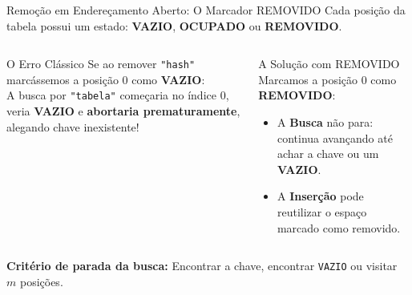 \documentclass[aspectratio=169,11pt]{beamer}
\begin{document}
\begin{frame}{Remoção em Endereçamento Aberto: O Marcador REMOVIDO}
  Cada posição da tabela possui um estado: \textbf{VAZIO}, \textbf{OCUPADO} ou \textbf{REMOVIDO}.

  \begin{columns}[T]
      \begin{alertblock}{O Erro Clássico}
        Se ao remover \texttt{"hash"} marcássemos a posição 0 como \textbf{VAZIO}:\\
        \vspace{0.4em}
        A busca por \texttt{"tabela"} começaria no índice 0, veria \textbf{VAZIO} e \textbf{abortaria prematuramente}, alegando chave inexistente!
      \end{alertblock}

      \begin{exampleblock}{A Solução com REMOVIDO}
        Marcamos a posição 0 como \textbf{REMOVIDO}:\\
        \vspace{0.4em}
        \begin{itemize}
          \item A \textbf{Busca} não para: continua avançando até achar a chave ou um \textbf{VAZIO}.
          \item A \textbf{Inserção} pode reutilizar o espaço marcado como removido.
        \end{itemize}
      \end{exampleblock}
  \end{columns}

  \vspace{0.8em}
  \centering
  \small
  \textbf{Critério de parada da busca:} Encontrar a chave, encontrar \texttt{VAZIO} ou visitar $m$ posições.
\end{frame}
\end{document}
